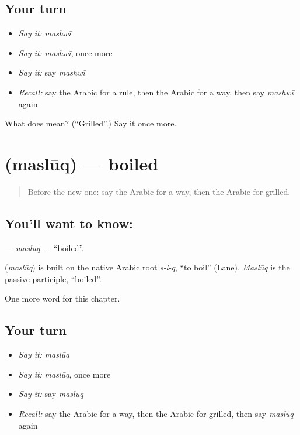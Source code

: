 \subsection*{Your turn}
\begin{itemize}
\raggedright
  \item \emph{Say it:} \emph{mashwī}
  \item \emph{Say it:} \emph{mashwī}, once more
  \item \emph{Say it:} say \emph{mashwī}
  \item \emph{Recall:} say the Arabic for a rule, then the Arabic for a way, then say \emph{mashwī} again
\end{itemize}

\begin{tcolorbox}[breakable,colback=teal!4,colframe=teal!35!black,title={Before you move on}]
What does  mean? (\textquotedblleft{}Grilled\textquotedblright{}.) Say it once more.
\end{tcolorbox}
\section[\texorpdfstring{\ar{مسلوق} (maslūq)}{مسلوق (maslūq)}]{ (maslūq) — boiled}

\label{lesson:AR-C209-masluq}



\begin{quote}
Before the new one: say the Arabic for a way, then the Arabic for grilled.
\end{quote}

\subsection*{You'll want to know: }
\textbf{} — \emph{maslūq} — \textquotedblleft{}boiled\textquotedblright{}.

\begin{cousinweb}
\textbf{} (\emph{maslūq}) is built on the native Arabic root \emph{s-l-q}, \textquotedblleft{}to boil\textquotedblright{} (Lane). \emph{Maslūq} is the passive participle, \textquotedblleft{}boiled\textquotedblright{}.
\end{cousinweb}

\begin{grammarlens}[title={What you've built}]
One more word for this chapter.
\end{grammarlens}

\subsection*{Your turn}
\begin{itemize}
\raggedright
  \item \emph{Say it:} \emph{maslūq}
  \item \emph{Say it:} \emph{maslūq}, once more
  \item \emph{Say it:} say \emph{maslūq}
  \item \emph{Recall:} say the Arabic for a way, then the Arabic for grilled, then say \emph{maslūq} again
\end{itemize}

